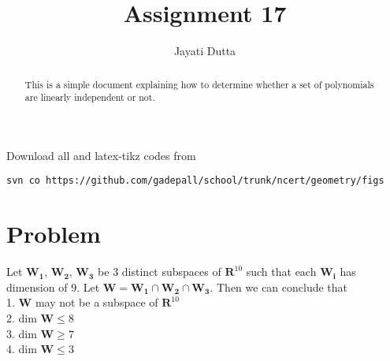 \documentclass[journal,12pt,twocolumn]{IEEEtran}
\begin{document}
\let\StandardTheFigure\thefigure
\let\vec\mathbf
\renewcommand{\thefigure}{\theproblem}



\def\putbox#1#2#3{\makebox[0in][l]{\makebox[#1][l]{}\raisebox{\baselineskip}[0in][0in]{\raisebox{#2}[0in][0in]{#3}}}}
     \def\rightbox#1{\makebox[0in][r]{#1}}
     \def\centbox#1{\makebox[0in]{#1}}
     \def\topbox#1{\raisebox{-\baselineskip}[0in][0in]{#1}}
     \def\midbox#1{\raisebox{-0.5\baselineskip}[0in][0in]{#1}}

\vspace{3cm}


\title{Assignment 17}
\author{Jayati Dutta}





\maketitle

\newpage


\bigskip

\renewcommand{\thefigure}{\theenumi}
\renewcommand{\thetable}{\theenumi}


\begin{abstract}
This is a simple document explaining how to determine whether a set of polynomials are linearly independent or not.
\end{abstract}

%

Download all and latex-tikz codes from 
%
\begin{lstlisting}
svn co https://github.com/gadepall/school/trunk/ncert/geometry/figs
\end{lstlisting}
%


\section{Problem}
Let $\vec{W_1}$, $\vec{W_2}$, $\vec{W_3}$ be 3 distinct subspaces of $\vec{R}^{10}$ such that each $\vec{W_i}$ has dimension of 9. Let $\vec{W} = \vec{W_1} \cap \vec{W_2} \cap \vec{W_3}$. Then we can conclude that\\
1. $\vec{W}$ may not be a subspace of $\vec{R}^{10}$\\
2. dim $\vec{W} \leq 8$\\
3. dim $\vec{W} \geq 7$\\
4. dim $\vec{W} \leq 3$\\
 
\end{document}
